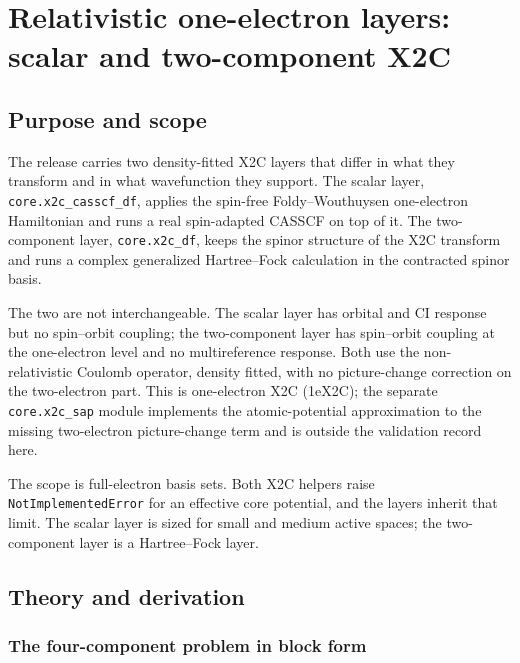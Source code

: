 \chapter{Relativistic one-electron layers: scalar and two-component X2C}
\label{ch:relativistic-layers}

\section{Purpose and scope}

The release carries two density-fitted X2C layers that differ in what
they transform and in what wavefunction they support.  The scalar
layer, \texttt{core.x2c\_casscf\_df}, applies the spin-free
Foldy--Wouthuysen one-electron Hamiltonian and runs a real
spin-adapted CASSCF on top of it.  The two-component layer,
\texttt{core.x2c\_df}, keeps the spinor structure of the X2C transform
and runs a complex generalized Hartree--Fock calculation in the
contracted spinor basis.

The two are not interchangeable.  The scalar layer has orbital and CI
response but no spin--orbit coupling; the two-component layer has
spin--orbit coupling at the one-electron level and no multireference
response.  Both use the non-relativistic Coulomb operator, density
fitted, with no picture-change correction on the two-electron part.
This is one-electron X2C (1eX2C); the separate \texttt{core.x2c\_sap}
module implements the atomic-potential approximation to the missing
two-electron picture-change term and is outside the validation record
here.

The scope is full-electron basis sets.  Both X2C helpers raise
\texttt{NotImplementedError} for an effective core potential, and the
layers inherit that limit.  The scalar layer is sized for small and
medium active spaces; the two-component layer is a Hartree--Fock layer.

\section{Theory and derivation}
\label{sec:x2c-theory}

\subsection{The four-component problem in block form}

